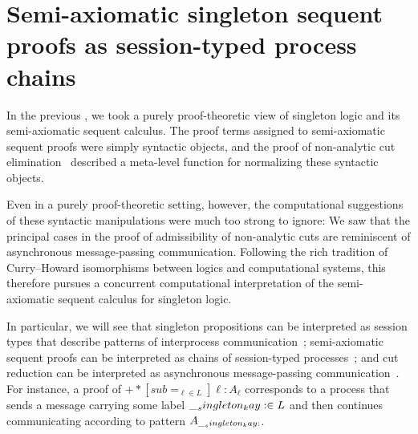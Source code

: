 \chapter[Semi-axiomatic singleton seq{}uent proofs as session-typed process chains]{Semi-axiomatic singleton seq{}uent\\proofs as session-typed process chains}\label{ch:process-chains}

In the previous , we took a purely proof-theoretic view of singleton logic and its semi-axiomatic sequent calculus.
The proof terms assigned to semi-axiomatic sequent proofs were simply syntactic objects,
and the proof of non-analytic cut elimination~ described a meta-level function for normalizing these syntactic objects.

Even in a purely proof-theoretic setting, however, the computational suggestions of these syntactic manipulations were much too strong to ignore:
We saw that the principal cases in the proof of admissibility of non-analytic cuts %
are reminiscent of asynchronous message-passing communication.
Following the rich tradition of Curry--Howard isomorphisms between logics and computational systems, this  therefore pursues a concurrent computational interpretation of the semi-axiomatic sequent calculus for singleton logic.

In particular, we will see that singleton propositions can be interpreted as session types that describe patterns of interprocess communication~; semi-axiomatic sequent proofs can be interpreted as chains of session-typed processes~; and cut reduction can be interpreted as asynchronous message-passing communication~.
For instance, a proof of $\plus*[sub=_{\ell \in L}]{\ell:A_{\ell}}$ corresponds to a process that sends a message carrying some label $\__singleton_kay: \in L$ and then continues communicating according to pattern $A_{\__singleton_kay:}$.

